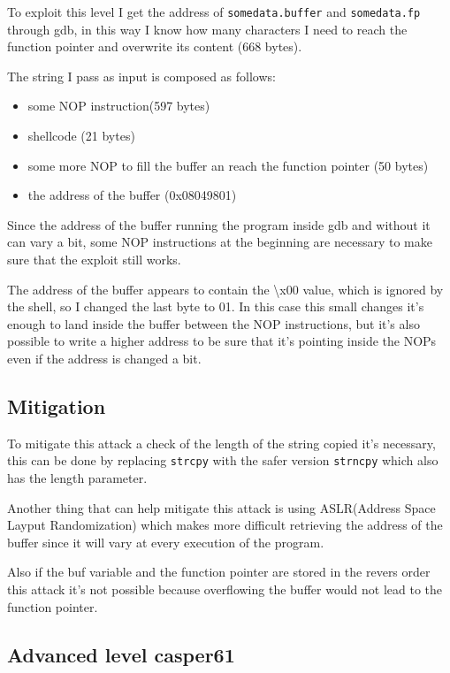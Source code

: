 \documentclass[a4paper,12pt]{article}
\begin{document}
To exploit this level I get the address of \texttt{somedata.buffer} and \texttt{somedata.fp} through gdb, in this way I know how many characters I need to reach the function pointer and overwrite its content (668 bytes).

The string I pass as input is composed as follows:

\begin{itemize}
\item some NOP instruction(597 bytes)
\item shellcode (21 bytes)
\item some more NOP to fill the buffer an reach the function pointer (50 bytes)
\item the address of the buffer (0x08049801)
\end{itemize}

Since the address of the buffer running the program inside gdb and without it can vary a bit, some NOP instructions at the beginning are necessary to make sure that the exploit still works.

The address of the buffer appears to contain the \textbackslash x00 value, which is ignored by the shell, so I changed the last byte to 01. In this case this small changes it's enough to land inside the buffer between the NOP instructions, but it's also possible to write a higher address to be sure that it's pointing inside the NOPs even if the address is changed a bit.  

\subsection{Mitigation}

To mitigate this attack a check of the length of the string copied it's necessary, this can be done by replacing \texttt{strcpy} with the safer version \texttt{strncpy} which also has the length parameter.

Another thing that can help mitigate this attack is using ASLR(Address Space Layput Randomization)
which makes more difficult retrieving the address of the buffer since it will vary at every execution of the program.

Also if the buf variable and the function pointer are stored in the revers order this attack it's not possible because overflowing the buffer would not lead to the function pointer.

\subsection{Advanced level casper61}
\end{document}

